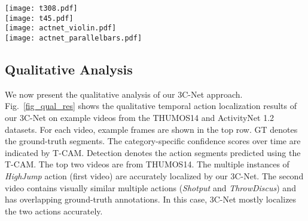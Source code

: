 \documentclass[10pt,twocolumn,letterpaper]{article}
\begin{document}
\begin{figure*}[t]
    \centering
    \texttt{[image: t308.pdf]} \\
    \texttt{[image: t45.pdf]} \\
    \texttt{[image: actnet\_violin.pdf]} \\
    \texttt{[image: actnet\_parallelbars.pdf]}
    \caption{Qualitative temporal action localization results of our 3C-Net approach on example videos from the THUMOS14 and ActivityNet 1.2 datasets. For each video, we show the example frames in the top row, ground-truth segments indicating the action instances as GT and the class-specific confidence scores over time as T-CAM (for brevity, only the thresholded T-CAM is shown). Action segments predicted using the T-CAM are denoted as Detection. Examples show different scenarios: multiple instances of same action (first video), visually-similar multiple action categories (second video) and long duration activities (third and fourth video). Our approach achieves promising localization performance on these variety of actions.}\vspace{-0.3cm}
    \label{fig_qual_res}
\end{figure*}




\subsection{Qualitative Analysis\label{sec_qual_res}}
We now present the qualitative analysis of our 3C-Net approach.
Fig.~\ref{fig_qual_res} shows the qualitative temporal action localization results of our 3C-Net on example videos from the THUMOS14 and ActivityNet 1.2 datasets. For each video, example frames are shown in the top row. GT denotes the ground-truth segments. The category-specific confidence scores over time are indicated by T-CAM. Detection denotes the action segments predicted using the T-CAM.  The top two videos are from  THUMOS14. The multiple instances of \emph{HighJump} action (first video) are accurately localized by our 3C-Net. The second video contains visually similar multiple actions (\emph{Shotput} and \emph{ThrowDiscus}) and has overlapping ground-truth annotations. In this case, 3C-Net mostly localizes the two actions accurately. 
\end{document}
